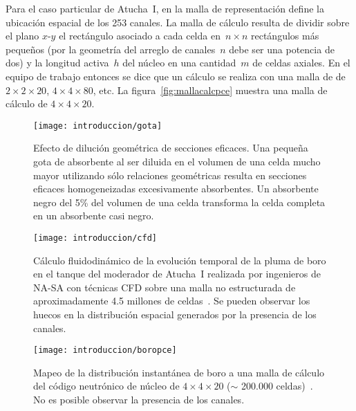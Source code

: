 Para el caso particular de Atucha~I, en la malla de representación define la ubicación espacial de los 253 canales. La malla de cálculo resulta de dividir sobre el plano $x$-$y$ el rectángulo asociado a cada celda en~$n\times n$ rectángulos más pequeños (por la geometría del arreglo de canales~$n$ debe ser una potencia de dos) y la longitud activa~$h$ del núcleo en una cantidad~$m$ de celdas axiales. En el equipo de trabajo entonces se dice que un cálculo se realiza con una malla de de $2\times 2 \times 20$, $4\times 4 \times 80$, etc. La figura~\ref{fig:mallacalcpce} muestra una malla de cálculo de $4 \times 4 \times 20$. 

\begin{figure}[b!]
 \begin{center}
  \texttt{[image: introduccion/gota]}
 \end{center}
\caption{\label{fig:gota}Efecto de dilución geométrica de secciones eficaces. Una pequeña gota de absorbente al ser diluida en el volumen de una celda mucho mayor utilizando sólo relaciones geométricas resulta en secciones eficaces homogeneizadas excesivamente absorbentes. Un absorbente negro del 5\% del volumen de una celda transforma la celda completa en un absorbente casi negro.}
\end{figure}

\begin{figure}[p]
 \begin{center}
\texttt{[image: introduccion/cfd]}
 \end{center}
\caption{\label{fig:cfd}Cálculo fluidodinámico de la evolución temporal de la pluma de boro en el tanque del moderador de Atucha~I realizada por ingenieros de NA-SA con técnicas CFD sobre una malla no estructurada de aproximadamente 4.5 millones de celdas~\cite{enief-2014-cpl}. Se pueden observar los huecos en la distribución espacial generados por la presencia de los canales.}

 \begin{center}
\texttt{[image: introduccion/boropce]}
 \end{center}
\caption{\label{fig:boropce}Mapeo de la distribución instantánea de boro a una malla de cálculo del código neutrónico de núcleo de $4 \times 4 \times 20$ ($\sim$ 200.000 celdas)~\cite{enief-2014-cpl}. No es posible observar la presencia de los canales.}
\end{figure}

